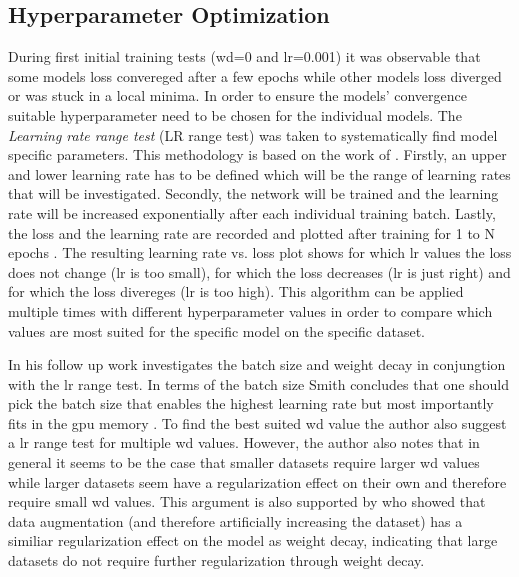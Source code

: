 \documentclass[11pt,
  paper=a4, 
  bibliography=totocnumbered,
	captions=tableheading,
	BCOR=10mm
]{scrreprt}
\theoremstyle{definition}
\newcommand\slcaption[1]{\setsepchar{.}\readlist*\pdots{#1}\caption[{\pdots[1].}]{#1}}
\begin{document}
\subsection{Hyperparameter Optimization} \label{sec:Hyperparameters}
During first initial training tests (\gls{wd}=0 and \gls{lr}=0.001) it was observable that some models loss convereged after a few epochs while other models loss diverged or was stuck in a local minima.
In order to ensure the models' convergence suitable hyperparameter need to be chosen for the individual models.
The \textit{Learning rate range test} (LR range test) was taken to systematically find model specific parameters.
This methodology is based on the work of \textcite{Smith2017}.
Firstly, an upper and lower learning rate has to be defined which will be the range of learning rates that will be investigated.
Secondly, the network will be trained and the learning rate will be increased exponentially after each individual training batch.
Lastly, the loss and the learning rate are recorded and plotted after training for 1 to N epochs \cite{Smith2017}.
The resulting learning rate vs. loss plot shows for which \gls{lr} values the loss does not change (lr is too small), for which the loss decreases (lr is just right) and for which the loss divereges (lr is too high).
This algorithm can be applied multiple times with different hyperparameter values in order to compare which values are most suited for the specific model on the specific dataset.

In his follow up work \textcite{Smith2018} investigates the batch size and weight decay in conjungtion with the \gls{lr} range test.
In terms of the batch size Smith concludes that one should pick the batch size that enables the highest learning rate but most importantly fits in the \gls{gpu} memory \cite{Smith2018}. 
To find the best suited \gls{wd} value the author also suggest a \gls{lr} range test for multiple \gls{wd} values.
However, the author also notes that in general it seems to be the case that smaller datasets require larger \gls{wd} values while larger datasets seem have a regularization effect on their own and therefore require small \gls{wd} values.
This argument is also supported by \textcite{Hernandez-Garcia2018} who showed that data augmentation (and therefore artificially increasing the dataset) has a similiar regularization effect on the model as weight decay, indicating that large datasets do not require further regularization through weight decay.

\end{document}
